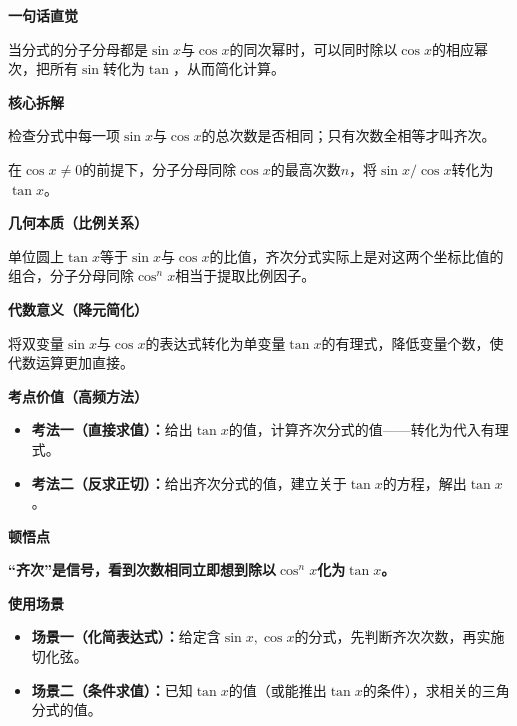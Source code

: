 \begin{explanationbox}

	\textbf{\textcolor{CExplanation}{一句话直觉}}

	当分式的分子分母都是$\sin x$与$\cos x$的同次幂时，可以同时除以$\cos x$的相应幂次，把所有$\sin$转化为$\tan$，从而简化计算。

	\medskip
	\textbf{\textcolor{CExplanation}{核心拆解}}
	\begin{description}[style=nextline, leftmargin=2.8em, labelsep=0.5em, itemsep=0.45em]
		\item[\textbf{要点一（齐次判定）：}]检查分式中每一项$\sin x$与$\cos x$的总次数是否相同；只有次数全相等才叫齐次。
		\item[\textbf{要点二（同除化简）：}]在$\cos x\neq0$的前提下，分子分母同除$\cos x$的最高次数$n$，将$\sin x/\cos x$转化为$\tan x$。
	\end{description}

	\medskip
	\textbf{\textcolor{CExplanation}{几何本质（比例关系）}}

	单位圆上$\tan x$等于$\sin x$与$\cos x$的比值，齐次分式实际上是对这两个坐标比值的组合，分子分母同除$\cos^n x$相当于提取比例因子。

	\medskip
	\textbf{\textcolor{CExplanation}{代数意义（降元简化）}}

	将双变量$\sin x$与$\cos x$的表达式转化为单变量$\tan x$的有理式，降低变量个数，使代数运算更加直接。

	\medskip
	\textbf{\textcolor{CExplanation}{考点价值（高频方法）}}
	\begin{itemize}[leftmargin=*, itemsep=0.5em, topsep=0.4em]
		\item \textbf{考法一（直接求值）：}给出$\tan x$的值，计算齐次分式的值——转化为代入有理式。
		\item \textbf{考法二（反求正切）：}给出齐次分式的值，建立关于$\tan x$的方程，解出$\tan x$。
	\end{itemize}

	\medskip
	\textbf{\textcolor{CExplanation}{顿悟点}}

	\textbf{“齐次”是信号，看到次数相同立即想到除以$\cos^n x$化为$\tan x$。}

	\medskip
	\textbf{\textcolor{CExplanation}{使用场景}}
	\begin{itemize}[leftmargin=*, itemsep=0.5em, topsep=0.4em]
		\item \textbf{场景一（化简表达式）：}给定含$\sin x,\cos x$的分式，先判断齐次次数，再实施切化弦。
		\item \textbf{场景二（条件求值）：}已知$\tan x$的值（或能推出$\tan x$的条件），求相关的三角分式的值。
	\end{itemize}
\end{explanationbox}

